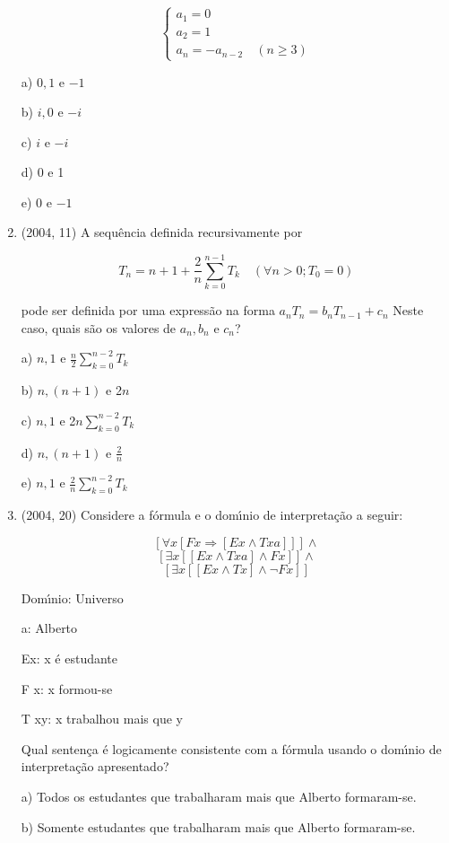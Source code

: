 \documentclass{article}
\begin{document}
\begin{enumerate}
$$\left\{\begin{array}{l}{a_{1}=0} \\ {a_{2}=1} \\ {a_{n}=-a_{n-2} \quad(n \geq 3)}\end{array}\right.$$

a) $0,1$ e $-1$

b) $i, 0$ e $-i$

c) $i$ e $-i$

d) 0 e 1

e) 0 e $-1$


\item(2004, 11) A sequência definida recursivamente por

$$T_{n}=n+1+\frac{2}{n} \sum_{k=0}^{n-1} T_{k} \quad\left(\forall n>0 ; T_{0}=0\right)$$

pode ser definida por uma expressão na forma $a_{n} T_{n}=b_{n} T_{n-1}+c_{n}$ Neste caso, quais
são os valores de $a_{n}, b_{n}$ e $c_{n}$?

a) $n, 1$ e $\frac{n}{2} \sum_{k=0}^{n-2} T_{k}$

b) $n,(n+1)$ e 2$n$

c) $n, 1$ e 2$n \sum_{k=0}^{n-2} T_{k}$

d) $n,(n+1)$ e $\frac{2}{n}$

e) $n, 1$ e $\frac{2}{n} \sum_{k=0}^{n-2} T_{k}$\newline







\item(2004, 20) Considere a fórmula e o domı́nio de interpretação a seguir:

$$[\forall x[F x \Rightarrow[E x \wedge T x a]]] \wedge$$
$$[\exists x[[E x \wedge T x a] \wedge F x]] \wedge$$
$$[\exists x[[E x \wedge T x] \wedge \neg F x]]$$

Domı́nio: Universo

a: Alberto

Ex: x é estudante

F x: x formou-se

T xy: x trabalhou mais que y

Qual sentença é logicamente consistente com a fórmula usando o domı́nio de interpretação apresentado?

a) Todos os estudantes que trabalharam mais que Alberto formaram-se.

b) Somente estudantes que trabalharam mais que Alberto formaram-se.


\end{enumerate}
\end{document}
